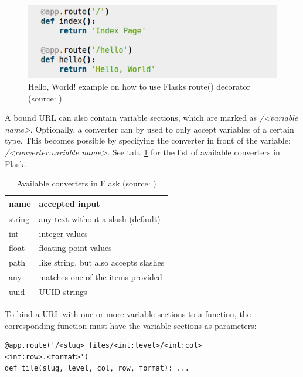 \begin{figure}[H]
	\begin{center}
		\includegraphics[scale=0.5]{img/route.png}
		\caption{Hello, World! example on how to use Flasks route() decorator (source: \cite{web:flask})}
		\label{fig4_routeDecorator}
	\end{center}
\end{figure}

A bound URL can also contain variable sections, which are marked as \emph{/{\textless}variable name{\textgreater}}. Optionally, a converter can by used to only accept variables of a certain type. This becomes possible by specifying the converter in front of the variable: \emph{/{\textless}converter:variable name{\textgreater}}\cite{web:flask}. See tab. \ref{tab4_converter} for the list of available converters in Flask.

\begin{table}[H]
	\begin{center}
		\begin{tabular}{| l | l |}
			\hline
			\textbf{name} & \textbf{accepted input}\\ \hline
			string & any text without a slash (default)\\ \hline
			int & integer values\\ \hline
			float & floating point values\\ \hline
			path & like string, but also accepts slashes \\ \hline
			any & matches one of the items provided\\ \hline
			uuid & UUID strings\\ \hline
		\end{tabular}
		\caption{Available converters in Flask (source: \cite{web:flask})}
		\label{tab4_converter}
	\end{center}
\end{table}

To bind a URL with one or more variable sections to a function, the corresponding function must have the variable sections as parameters:

\begin{lstlisting}[frame=single]
@app.route('/<slug>_files/<int:level>/<int:col>_
<int:row>.<format>')
def tile(slug, level, col, row, format): ...
\end{lstlisting}

